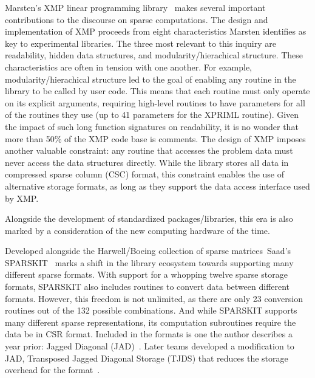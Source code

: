 Marsten's XMP linear programming library~\cite{marsten1981design} makes several important contributions to the discourse on sparse computations.
The design and implementation of XMP proceeds from eight characteristics Marsten identifies as key to experimental libraries. 
The three most relevant to this inquiry are readability, hidden data structures, and modularity/hierachical structure. 
These characteristics are often in tension with one another. 
For example, modularity/hierachical structure led to the goal of enabling any routine in the library to be called by user code.
This means that each routine must only operate on its explicit arguments, requiring high-level routines to have parameters for all of the routines they use (up to 41 parameters for the XPRIML routine).
Given the impact of such long function signatures on readability, it is no wonder that more than 50\% of the XMP code base is comments.
The design of XMP imposes another valuable constraint: any routine that accesses the problem data must never access the data structures directly. 
While the library stores all data in compressed sparse column (CSC) format, this constraint enables the use of alternative storage formats, as long as they support the data access interface used by XMP.

Alongside the development of standardized packages/libraries, this era is also marked by a consideration of the new computing hardware of the time.

\cite{duff1982experience}
\cite{cleveland1987progress}

\cite{dongarraxz1994sparse}


Developed alongside the Harwell/Boeing collection of sparse matrices~\cite{duff1989sparse}Saad's SPARSKIT~\cite{saad1990sparskit} marks a shift in the library ecosystem towards supporting many different sparse formats. 
With support for a whopping twelve sparse storage formats, SPARSKIT also includes routines to convert data between different formats. 
However, this freedom is not unlimited, as there are only 23 conversion routines out of the 132 possible combinations. 
And while SPARSKIT supports many different sparse representations, its computation subroutines require the data be in CSR format. 
Included in the formats is one the author describes a year prior: Jagged Diagonal (JAD)~\cite{saad1989}.
Later teams developed a modification to JAD, Transposed Jagged Diagonal Storage (TJDS) that reduces the storage overhead for the format~\cite{montagne2004optimal}.


